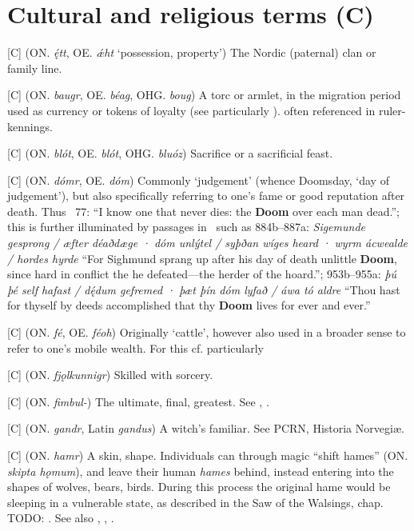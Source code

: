 
\section{Cultural and religious terms (C)}
\begin{itemize}

[C] (ON. \emph{ę́tt}, OE. \emph{ǽht} ‘possession, property’)
  The Nordic (paternal) clan or family line.

[C] (ON. \emph{baugr}, OE. \emph{béag}, OHG. \emph{boug})
  A torc or armlet, in the migration period used as currency or tokens of loyalty (see particularly \Hildebrandslied). often referenced in ruler-kennings.

[C] (ON. \emph{blót}, OE. \emph{blót}, OHG. \emph{bluóz})
  Sacrifice or a sacrificial feast.

[C] (ON. \emph{dómr}, OE. \emph{dóm})
  Commonly ‘judgement’ (whence Doomsday, ‘day of judgement’), but also specifically referring to one’s fame or good reputation after death. Thus \Havamal\ 77: “I know one that never dies: the \textbf{Doom} over each man dead.”; this is further illuminated by passages in \Beowulf\ such as 884b–887a: \emph{Sigemunde gesprong / æfter déaðdæge · dóm unlýtel / syþðan wíges heard · wyrm ácwealde / hordes hyrde} “For Sighmund sprang up after his day of death unlittle \textbf{Doom}, since hard in conflict the  he defeated—the herder of the hoard.”; 953b–955a: \emph{þú þé self hafast / dę́dum gefremed · þæt þín dóm lyfað / áwa tó aldre} “Thou hast for thyself by deeds accomplished that thy \textbf{Doom} lives for ever and ever.”

[C] (ON. \emph{fé}, OE. \emph{féoh})
  Originally ‘cattle’, however also used in a broader sense to refer to one’s mobile wealth. For this cf. particularly \Havamal

[C] (ON. \emph{fjǫlkunnigr})
  Skilled with sorcery.

[C] (ON. \emph{fimbul-})
  The ultimate, final, greatest. See , .

[C] (ON. \emph{gandr}, Latin \emph{gandus})
  A witch’s familiar. See PCRN, Historia Norvegiæ. %

[C] (ON. \emph{hamr})
  A skin, shape. Individuals can through magic “shift hames” (ON. \emph{skipta hǫmum}), and leave their human \emph{hames} behind, instead entering into the shapes of wolves, bears, birds. During this process the original hame would be sleeping in a vulnerable state, as described in the Saw of the Walsings, chap. TODO: . See also , , .


\end{itemize}
